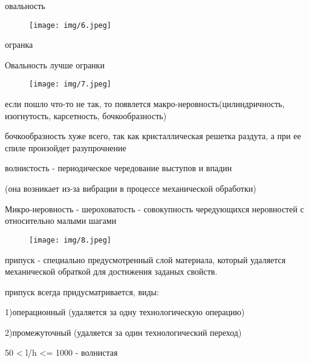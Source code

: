 {\begin{center}
    \par овальность 

    \begin{figure}[H]
    \centering\texttt{[image: img/6.jpeg]} 
    \end{figure}

    \par огранка

    \par Овальность лучше огранки

    \begin{figure}[H]
    \centering\texttt{[image: img/7.jpeg]} 
    \end{figure}
    
    \par если пошло что-то не так, то появлется макро-неровность(цилиндричность, изогнутость, карсетность, бочкообразность)

    \par бочкообразность хуже всего, так как кристаллическая решетка раздута, а при ее спиле произойдет разупрочнение

    \par волнистость - периодическое чередование выступов и впадин 
    \par (она возникает из-за вибрации в процессе механической обработки)

    \par Микро-неровность - шероховатость - совокупность чередующихся неровностей с относительно малыми шагами

    \begin{figure}[H]
    \centering\texttt{[image: img/8.jpeg]} 
    \end{figure}

    \par припуск - специально предусмотренный слой материала, который удаляется механической обраткой для достижения заданых свойств.

    \par припуск всегда придусматривается, виды:

    \par 1)операционный (удаляется за одну технологическую операцию)

    \par 2)промежуточный (удаляется за один технологический переход)

    \par 50 < l/h <= 1000 - волнистая 


\end{center}}
